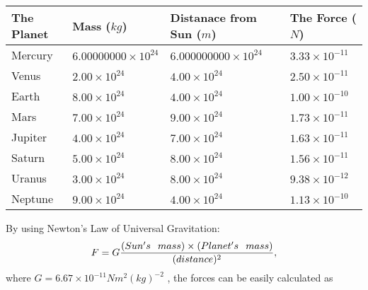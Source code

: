 \documentclass[12pt]{article}
\begin{document}
 
\begin{tabular}{|l|l|l|l|}
\hline
The Planet & Mass ($kg$) & Distanace from Sun ($m$) & The Force ($N$)\\
\hline
Mercury  &
           $ %
6.00000000 \times 10^{24} $   &
             $ %
6.000000000 \times 10^{24} $    & $ %
3.33 \times 10^{-11} $
\\  \hline
Venus    &
           $  %
2.00 \times 10^{24}  $     &
             $ %
4.00 \times 10^{24} $    & $ %
2.50 \times 10^{-11} $
\\  \hline
Earth    &
           $  %
8.00 \times 10^{24}  $     &
             $ %
4.00 \times 10^{24} $    & $ %
1.00 \times 10^{-10} $
\\   \hline
Mars     &
           $  %
7.00 \times 10^{24} $     &
             $ %
9.00 \times 10^{24} $    & $ %
1.73 \times 10^{-11} $
\\   \hline
Jupiter  &
           $  %
4.00 \times 10^{24} $    &
             $ %
7.00 \times 10^{24} $    & $ %
1.63 \times 10^{-11} $
\\  \hline
Saturn   &
           $  %
5.00 \times 10^{24} $    &
             $ %
8.00 \times 10^{24}  $    & $ %
1.56 \times 10^{-11} $
\\  \hline
Uranus   &
           $  %
3.00 \times 10^{24} $    &
             $ %
8.00 \times 10^{24} $    & $ %
9.38 \times 10^{-12} $
\\  \hline
Neptune  &
           $  %
9.00 \times 10^{24} $    &
             $ %
4.00 \times 10^{24} $    & $ %
1.13 \times 10^{-10} $
\\  \hline
 
\end{tabular}
 
 
 
 
 
 
\noindent{}

By using Newton's Law of Universal Gravitation:
\[
F=G \frac{(Sun's \hspace{0.1in} mass) \times (Planet's \hspace{0.1in} mass)} { (distance)^2},
\]
where
$ G= %
6.67 \times 10^{-11} N m^{2}(kg)^{-2}$ , the forces can be easily calculated as
 
\vspace{0.2in}
 
\end{document}
